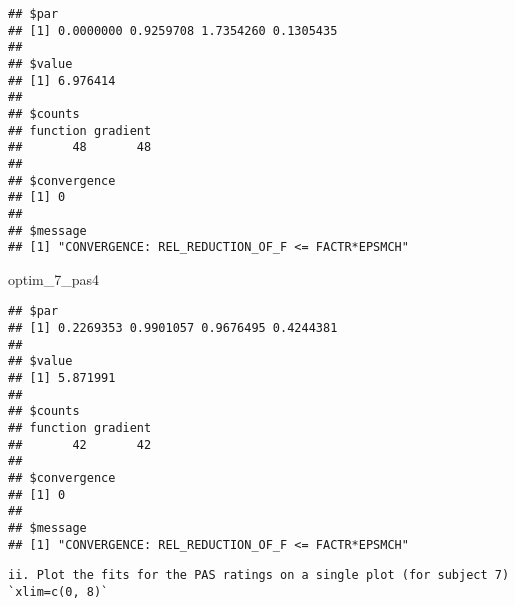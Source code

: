 \documentclass[
]{article}
\newenvironment{Shaded}{\begin{snugshade}}{\end{snugshade}}
\newcommand{\NormalTok}[1]{#1}
\begin{document}
\begin{verbatim}
## $par
## [1] 0.0000000 0.9259708 1.7354260 0.1305435
## 
## $value
## [1] 6.976414
## 
## $counts
## function gradient 
##       48       48 
## 
## $convergence
## [1] 0
## 
## $message
## [1] "CONVERGENCE: REL_REDUCTION_OF_F <= FACTR*EPSMCH"
\end{verbatim}

\begin{Shaded}
\begin{Highlighting}[]
\NormalTok{optim\_7\_pas4}
\end{Highlighting}
\end{Shaded}

\begin{verbatim}
## $par
## [1] 0.2269353 0.9901057 0.9676495 0.4244381
## 
## $value
## [1] 5.871991
## 
## $counts
## function gradient 
##       42       42 
## 
## $convergence
## [1] 0
## 
## $message
## [1] "CONVERGENCE: REL_REDUCTION_OF_F <= FACTR*EPSMCH"
\end{verbatim}

\begin{verbatim}
ii. Plot the fits for the PAS ratings on a single plot (for subject 7) `xlim=c(0, 8)`
\end{verbatim}
\end{document}
